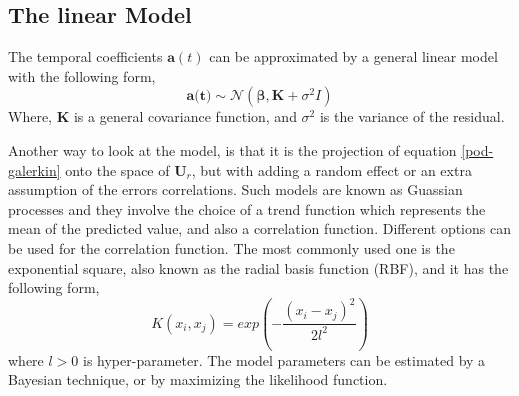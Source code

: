 \documentclass{anstrans}
\begin{document}
\subsection{The linear Model}
The temporal coefficients $\textbf{a}(t)$ can be approximated by a general linear model with the following form,  
    \begin{equation}
    \textbf{a(t)} \sim \mathcal{N} ({\boldsymbol{\beta}}, \textbf{K}+ \sigma^2I)
    \end{equation}
Where, $\textbf{K}$ is a general covariance function, and $\sigma^2$ is the variance of the residual.

Another way to look at the model, is that it is the projection of equation \ref{pod-galerkin} onto the space of $\textbf{U}_r$, but with adding a random effect or an extra assumption of the errors correlations.
Such models are known as Guassian processes \cite{rasmussen2003gaussian} and they involve the choice of a trend function which represents the mean of the predicted value, and also a correlation function. 
Different options can be used for the correlation function. The most commonly used one is the exponential square, also known as the radial basis function (RBF), and it has the following form,
 \begin{equation}
  K(x_i, x_j) =  exp(-\frac{(x_i - x_j)^2}{2l^2})
\end{equation}
where $l > 0$ is hyper-parameter. The model parameters can be estimated by a Bayesian technique, or by maximizing the likelihood function.
\end{document}
